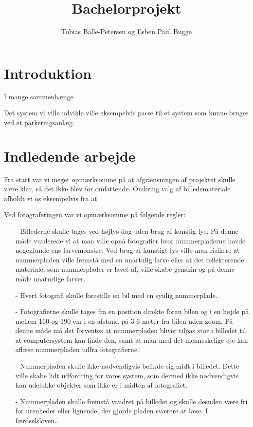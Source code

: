 \documentclass[11pt,a4paper,final]{report}
\author{Tobias Balle-Petersen og Esben Paul Bugge}
\title{Bachelorprojekt}
\begin{document}
\maketitle

\tableofcontents
\newpage

\section{Introduktion}

I mange sammenhænge


Det system vi ville udvikle ville eksempelvis passe til et system som kunne bruges ved et parkeringsanlæg.

\section{Indledende arbejde}
Fra start var vi meget opmærksomme på at afgrænsningen af projektet skulle være klar, så det ikke blev for omfattende. Omkring valg af billedemateriale afholdt vi os eksempelvis fra at 

Ved fotograferingen var vi opmærksomme på følgende regler:

\begin{itemize}
\item[-] Billederne skulle tages ved højlys dag uden brug af kunstig lys. På denne måde vurderede vi at man ville opnå fotografier hvor nummerpladerne havde nogenlunde ens farvemønstre. Ved brug af kunstigt lys ville man risikere at nummerpladen ville fremstå med en unartulig farve eller at det reflekterende materiale, som nummerplader er lavet af, ville skabe genskin og på denne måde unaturlige farver.
\item[-] Hvert fotografi skulle forestille en bil med en synlig nummerplade.
\item[-] Fotografierne skulle tages fra en position direkte foran bilen og i en højde på mellem 160 og 190 cm i en afstand på 3-6 meter fra bilen uden zoom. På denne måde må det forventes at nummerpladen bliver tilpas stor i billedet til at computersystem kan finde den, samt at man med det menneskelige øje kan aflæse nummerpladen udfra fotografierne.
\item[-] Nummerpladen skulle ikke nødvendigvis befinde sig midt i billedet. Dette ville skabe lidt udfordring for vores system, som dermed ikke nødvendigvis kan udelukke objekter som ikke er i midten af fotografiet.
\item[-] Nummerpladen skulle fremstå vandret på billedet og skulle desuden være fri for urenheder eller lignende, der gjorde pladen sværere at læse. I færdselsloven..
\end{itemize}
\end{document}
